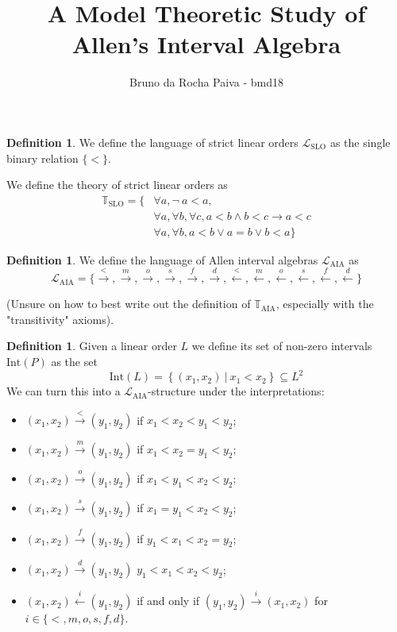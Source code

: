 \documentclass[11pt %
              ]{article}
\title{A Model Theoretic Study of Allen's Interval Algebra}
\author{Bruno da Rocha Paiva - bmd18}
\date{} %
\newcommand{\lang}{\mathcal{L}}
\newcommand{\theory}{\mathbb{T}}
\newcommand{\lslo}{\lang_\text{SLO}}
\newcommand{\tslo}{\theory_\text{SLO}}
\newcommand{\laia}{\lang_\text{AIA}}
\newcommand{\taia}{\theory_\text{AIA}}
\newcommand{\before}{\overset{<}{\longrightarrow}}
\newcommand{\meets}{\overset{m}{\longrightarrow}}
\newcommand{\overlaps}{\overset{o}{\longrightarrow}}
\newcommand{\starts}{\overset{s}{\longrightarrow}}
\newcommand{\finishes}{\overset{f}{\longrightarrow}}
\newcommand{\contained}{\overset{d}{\longrightarrow}}
\newcommand{\after}{\overset{<}{\longleftarrow}}
\newcommand{\metby}{\overset{m}{\longleftarrow}}
\newcommand{\overlappedby}{\overset{o}{\longleftarrow}}
\newcommand{\startedby}{\overset{s}{\longleftarrow}}
\newcommand{\finishedby}{\overset{f}{\longleftarrow}}
\newcommand{\contains}{\overset{d}{\longleftarrow}}
\newcommand{\inter}[1][-]{\text{Int}\left(#1\right)}
\theoremstyle{plain}
\theoremstyle{definition}
\newtheorem{defn}[thm]{Definition}
\theoremstyle{remark}
\begin{document}
\maketitle

\begin{defn}
  We define the language of strict linear orders $\lslo$ as the single binary relation $\{ < \}$.

  We define the theory of strict linear orders as
  \begin{align*}
    \tslo = \{ & \forall a, \lnot\ a < a, \\
              & \forall a, \forall b, \forall c, a < b \land b < c \rightarrow a < c \\
              & \forall a, \forall b, a < b \lor a = b \lor b < a \}
  \end{align*}
\end{defn}

\begin{defn}
  We define the language of Allen interval algebras $\laia$ as
  \begin{equation*}
    \laia = \{ \before, \meets, \overlaps, \starts, \finishes, \contained,
               \after, \metby, \overlappedby, \startedby, \finishedby, \contains \}
  \end{equation*}

  (Unsure on how to best write out the definition of $\taia$, especially with the "transitivity"
  axioms).
\end{defn}


\begin{defn}
  Given a linear order $L$ we define its set of non-zero intervals $\inter[P]$ as the set
  \begin{equation*}
    \inter[L] = \left\{(x_1,x_2)\ |\ x_1 < x_2 \right\} \subseteq L^2
  \end{equation*}
  We can turn this into a $\laia$-structure under the interpretations:
  \begin{itemize}
    \item $(x_1,x_2) \before (y_1,y_2)$ if $x_1<x_2<y_1<y_2$;
    \item $(x_1,x_2) \meets (y_1,y_2)$ if $x_1<x_2=y_1<y_2$;
    \item $(x_1,x_2) \overlaps (y_1,y_2)$ if $x_1<y_1<x_2<y_2$;
    \item $(x_1,x_2) \starts (y_1,y_2)$ if $x_1=y_1<x_2<y_2$;
    \item $(x_1,x_2) \finishes (y_1,y_2)$ if $y_1<x_1<x_2=y_2$;
    \item $(x_1,x_2) \contained (y_1,y_2)$ $y_1<x_1<x_2<y_2$;
    \item $(x_1,x_2) \overset{i}{\longleftarrow} (y_1,y_2)$ if and only if
      $(y_1,y_2) \overset{i}{\longrightarrow} (x_1,x_2)$ for $i \in \{<,m,o,s,f,d\}$.
  \end{itemize}
\end{defn}
\end{document}

